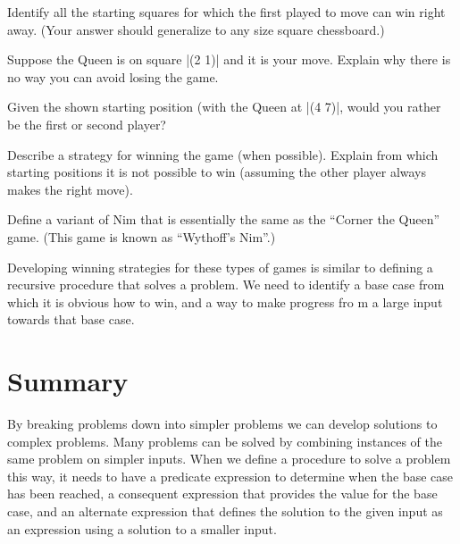 \begin{schemeregion}
{{\begin{subexerciselist}
\item Identify all the starting squares for which the first played to move can win right away.  (Your answer should generalize to any size square chessboard.)
\item Suppose the Queen is on square \scheme|(2 1)| and it is your move.  Explain why there is no way you can avoid losing the game.
\item \greenstar Given the shown starting position (with the Queen at \scheme|(4 7)|, would you rather be the first or second player?
\item \goldstar Describe a strategy for winning the game (when possible).  Explain from which starting positions it is not possible to win (assuming the other player always makes the right move).
\item \goldstar Define a variant of Nim that is essentially the same as the ``Corner the Queen'' game.  (This game is known as ``Wythoff's Nim''.)
\end{subexerciselist}

Developing winning strategies for these types of games is similar to defining a recursive procedure that solves a problem.  We need to identify a base case from which it is obvious how to win, and a way to make progress fro	m a large input towards that base case.

}

\section{Summary}

By breaking problems down into simpler problems we can develop solutions to complex problems.  Many problems can be solved by combining instances of the same problem on simpler inputs.  When we define a procedure to solve a problem this way, it needs to have a predicate expression to determine when the base case has been reached, a consequent expression that provides the value for the base case, and an alternate expression that defines the solution to the given input as an expression using a solution to a smaller input.  


}
\end{schemeregion}
